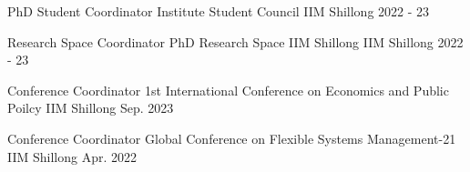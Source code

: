 


\begin{cvhonors}


\cvhonor
{PhD Student Coordinator} %
{Institute Student Council} %
{IIM Shillong} %
{2022 - 23} %

    

\cvhonor
{Research Space Coordinator} %
{PhD Research Space IIM Shillong} %
{IIM Shillong} %
{2022 - 23} %

\cvhonor
{Conference Coordinator} %
{1st International Conference on Economics and Public Poilcy} %
{IIM Shillong} %
{Sep. 2023} %

\cvhonor
{Conference Coordinator} %
{Global Conference on Flexible Systems Management-21} %
{IIM Shillong} %
{Apr. 2022} %



\end{cvhonors}